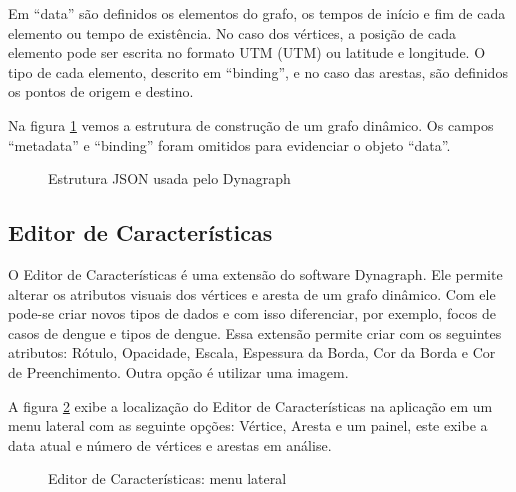 Em ``data'' são definidos os elementos do grafo, os tempos de início e fim de cada elemento ou tempo de existência. No caso dos vértices, a posição de cada elemento pode ser escrita no formato \acrshort{UTM} (\acrlong{UTM}) ou latitude e longitude.
O tipo de cada elemento, descrito em ``binding'', e no caso das arestas, são definidos os pontos de origem e destino.

Na figura \ref{fig:jsondynagraph} vemos a estrutura de construção de um grafo dinâmico. Os campos ``metadata'' e ``binding'' foram omitidos para evidenciar o objeto ``data''.
\FloatBarrier

\begin{figure}[!htbp]
  \caption{Estrutura JSON usada pelo Dynagraph}
  \label{fig:jsondynagraph}
\end{figure}

\subsection{Editor de Características}

O Editor de Características é uma extensão do software Dynagraph. Ele permite alterar os atributos visuais dos vértices e aresta de um grafo dinâmico. Com ele pode-se criar novos tipos de dados e com isso diferenciar, por exemplo, focos de casos de dengue e tipos de dengue.
Essa extensão permite criar com os seguintes atributos: Rótulo, Opacidade, Escala, Espessura da Borda, Cor da Borda e Cor de Preenchimento. Outra opção é utilizar uma imagem.
 
A figura \ref{fig:edCaMenu} exibe a localização do Editor de Características na aplicação em um menu lateral com as seguinte opções: Vértice, Aresta e um painel, este exibe a data atual e número de vértices e arestas em análise.
\begin{figure}[!ht]
	\centering	
	\caption{\label{fig:edCaMenu} Editor de Características: menu lateral}
\end{figure}
\FloatBarrier

